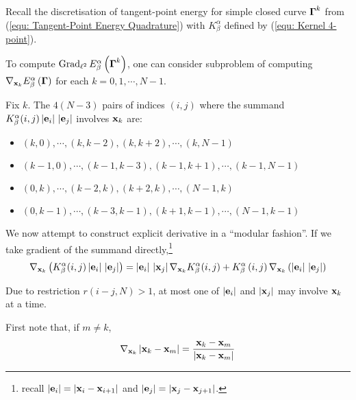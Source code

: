 \documentclass[../dissertation.tex]{subfiles}
\begin{document}
Recall the discretisation of tangent-point energy for simple closed curve $\boldsymbol{\Gamma}^k$ from (\ref{equ: Tangent-Point Energy Quadrature})
with $K_{\beta}^{\alpha}$ defined by (\ref{equ: Kernel 4-point}).

To compute $\operatorname{Grad}_{\ell^2} E_{\beta}^{\alpha} \left( \boldsymbol{\Gamma}^k \right)$,
one can consider subproblem of computing $\nabla_{\mathbf{x}_k} E_{\beta}^{\alpha} \left( \boldsymbol{\Gamma} \right)$
for each $k=0, 1, \cdots, N-1$.

Fix $k$.
The $4\left( N-3 \right)$ pairs of indices $(i,j)$ where the summand $K_{\beta}^{\alpha} (i,j) \left| \mathbf{e}_i \right|\,\left| \mathbf{e}_j \right|$ involves $\mathbf{x}_k$ are:
\begin{itemize}
    \item $(k,0), \cdots, (k,k-2), (k,k+2), \cdots, (k,N-1)$
    \item $(k-1,0), \cdots, (k-1,k-3), (k-1,k+1), \cdots, (k-1,N-1)$
    \item $(0, k), \cdots, (k-2,k), (k+2,k), \cdots, (N-1,k)$
    \item $(0,k-1), \cdots, (k-3,k-1), (k+1,k-1), \cdots, (N-1, k-1)$
\end{itemize}

We now attempt to construct explicit derivative in a ``modular fashion''.
If we take gradient of the summand directly,\footnote{recall $\left| \mathbf{e}_i \right| = \left| \mathbf{x}_i - \mathbf{x}_{i+1} \right|$ and $\left| \mathbf{e}_j \right| = \left| \mathbf{x}_j - \mathbf{x}_{j+1} \right|$.}
\begin{equation}
    \nabla_{\mathbf{x}_k} \left( K_{\beta}^{\alpha} (i,j) \left| \mathbf{e}_i \right|\,\left| \mathbf{e}_j \right| \right) = \left| \mathbf{e}_i \right|\,\left| \mathbf{x}_j \right| \nabla_{\mathbf{x}_k} K_{\beta}^{\alpha} (i,j) + K_{\beta}^{\alpha} \left( i,j \right) \nabla_{\mathbf{x}_k} \left( \left| \mathbf{e}_i \right| \, \left| \mathbf{e}_j \right| \right)
    \label{equ: Exact Gradient 1}
\end{equation}

Due to restriction $r\left( i-j,N \right) > 1$, at most one of $\left| \mathbf{e}_i \right|$ and $\left| \mathbf{x}_j \right|$ may involve $\mathbf{x}_k$ at a time.

First note that, if $m \neq k$,
\begin{equation}
    \nabla_{\mathbf{x}_k} \left| \mathbf{x}_k - \mathbf{x}_m \right| = \frac{\mathbf{x}_k - \mathbf{x}_m}{\left| \mathbf{x}_k - \mathbf{x}_m \right|}
    \label{equ: Exact Gradient 2}
\end{equation}
\end{document}
